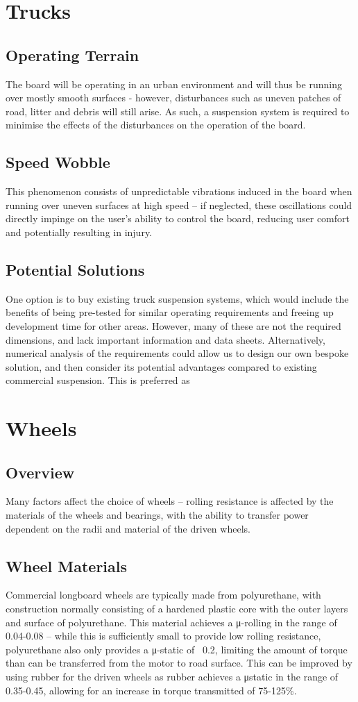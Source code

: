 \documentclass[journal,10pt]{IEEEtran}
\begin{document}
\section{Trucks}
    \subsection{Operating Terrain}
    The board will be operating in an urban environment and will thus be running over mostly smooth surfaces - however, disturbances such as uneven patches of road, litter and debris will still arise. As such, a suspension system is required to minimise the effects of the disturbances on the operation of the board.
    \subsection{Speed Wobble}
    This phenomenon consists of unpredictable vibrations induced in the board when running over uneven surfaces at high speed – if neglected, these oscillations could directly impinge on the user’s ability to control the board, reducing user comfort and potentially resulting in injury. 
    \subsection{Potential Solutions}
    One option is to buy existing truck suspension systems, which would include the benefits of being pre-tested for similar operating requirements and freeing up development time for other areas. However, many of these are not the required dimensions, and lack important information and data sheets. Alternatively, numerical analysis of the requirements could allow us to design our own bespoke solution, and then consider its potential advantages compared to existing commercial suspension. This is preferred as
\section{Wheels}
    \subsection{Overview}
    Many factors affect the choice of wheels – rolling resistance is affected by the materials of the wheels and bearings, with the ability to transfer power dependent on the radii and material of the driven wheels.
    \subsection{Wheel Materials}
    Commercial longboard wheels are typically made from polyurethane, with construction normally consisting of a hardened plastic core with the outer layers and surface of polyurethane. This material achieves a μ-rolling in the range of 0.04-0.08 – while this is sufficiently small to provide low rolling resistance, polyurethane also only provides a μ-static of ~0.2, limiting the amount of torque than can be transferred from the motor to road surface. This can be improved by using rubber for the driven wheels as rubber achieves a μstatic in the range of 0.35-0.45, allowing for an increase in torque transmitted of 75-125\%.
\end{document}
